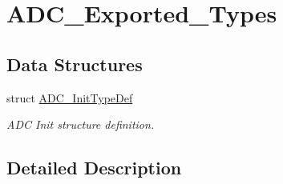 \hypertarget{group___a_d_c___exported___types}{}\section{A\+D\+C\+\_\+\+Exported\+\_\+\+Types}
\label{group___a_d_c___exported___types}
\subsection*{Data Structures}
\begin{DoxyCompactItemize}
\item 
struct \mbox{\hyperlink{struct_a_d_c___init_type_def}{A\+D\+C\+\_\+\+Init\+Type\+Def}}
\begin{DoxyCompactList}\small\item\em A\+DC Init structure definition. \end{DoxyCompactList}\end{DoxyCompactItemize}


\subsection{Detailed Description}
